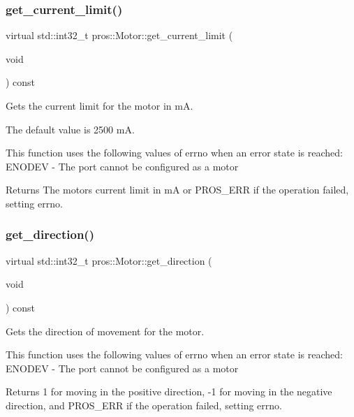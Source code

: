 \subsubsection{\texorpdfstring{get\+\_\+current\+\_\+limit()}{get\_current\_limit()}}
{\footnotesize\ttfamily virtual std\+::int32\+\_\+t pros\+::\+Motor\+::get\+\_\+current\+\_\+limit (\begin{DoxyParamCaption}\item[{void}]{ }\end{DoxyParamCaption}) const\hspace{0.3cm}{\ttfamily [virtual]}}

Gets the current limit for the motor in mA.

The default value is 2500 mA.

This function uses the following values of errno when an error state is reached\+: E\+N\+O\+D\+EV -\/ The port cannot be configured as a motor

\begin{DoxyReturn}{Returns}
The motor\textquotesingle{}s current limit in mA or P\+R\+O\+S\+\_\+\+E\+RR if the operation failed, setting errno. 
\end{DoxyReturn}
\mbox{\label{classpros_1_1Motor_acea42a96da651f72f138ea268c76217f}} 
\subsubsection{\texorpdfstring{get\+\_\+direction()}{get\_direction()}}
{\footnotesize\ttfamily virtual std\+::int32\+\_\+t pros\+::\+Motor\+::get\+\_\+direction (\begin{DoxyParamCaption}\item[{void}]{ }\end{DoxyParamCaption}) const\hspace{0.3cm}{\ttfamily [virtual]}}

Gets the direction of movement for the motor.

This function uses the following values of errno when an error state is reached\+: E\+N\+O\+D\+EV -\/ The port cannot be configured as a motor

\begin{DoxyReturn}{Returns}
1 for moving in the positive direction, -\/1 for moving in the negative direction, and P\+R\+O\+S\+\_\+\+E\+RR if the operation failed, setting errno. 
\end{DoxyReturn}
\mbox{\label{classpros_1_1Motor_a6f0b39894abf612a1965a66224893c71}} 
